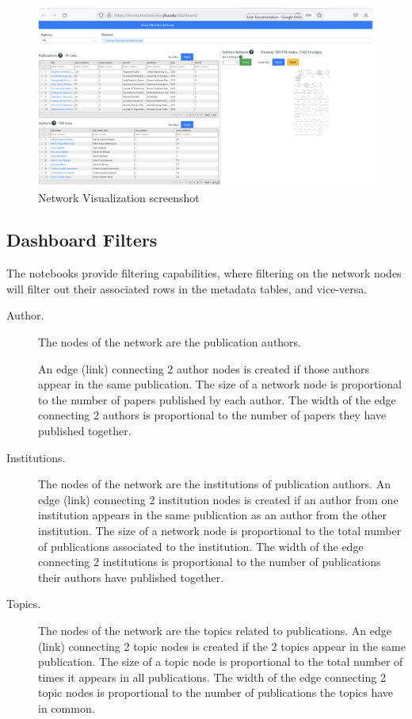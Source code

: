 \documentclass[titlepage, 11pt]{article}
\begin{document}
{%
\begin{figure}
\centering
  \includegraphics[scale=0.40]{network.png}
  \caption{Network Visualization screenshot}
  \label{fig:network}
\end{figure}

\subsection{Dashboard Filters}
The notebooks provide filtering capabilities, where filtering on the network nodes will filter out their associated rows in the metadata tables, and vice-versa.

\begin{description}
\item [Author.] The nodes of the network are the publication authors.

An edge (link) connecting 2 author nodes is created if those authors appear in the same publication. The size of a network node is proportional to the number of papers published by each author. The width of the edge connecting 2 authors is proportional to the number of papers they have published together.

\item [Institutions.] The nodes of the network are the institutions of publication authors. An edge (link) connecting 2 institution nodes is created if an author from one institution appears in the same publication as an author from the other institution. The size of a network node is proportional to the total number of publications associated to the institution. The width of the edge connecting 2 institutions is proportional to the number of publications their authors have published together.

\item [Topics.] The nodes of the network are the topics related to publications.  An edge (link) connecting 2 topic nodes is created if the 2 topics appear in the same publication. The size of a topic node is proportional to the total number of times it appears in all publications. The width of the edge connecting 2 topic nodes is proportional to the number of publications the topics have in common.


\end{description}}
\end{document}
